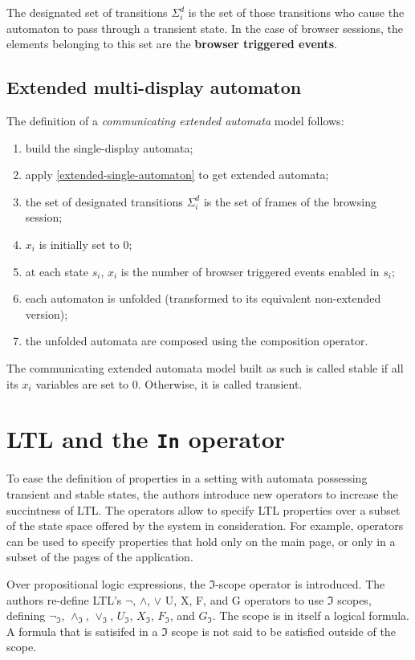 \documentclass[a4paper,10pt]{article}
\theoremstyle{plain} %
\theoremstyle{definition}
\theoremstyle{remark}
\begin{document}
The designated set of transitions $\Sigma^d_i$ is the set of those transitions who cause the automaton to pass through a transient state. In the case of browser sessions, the elements belonging to this set are the \textbf{browser triggered events}.

\subsection{Extended multi-display automaton}

The definition of a \textit{communicating extended automata} model follows:

\begin{enumerate}
  \item build the single-display automata;
  \item apply \cref{extended-single-automaton} to get extended automata;
  \item the set of designated transitions $\Sigma^d_i$ is the set of frames of the browsing session;
  \item $x_i$ is initially set to 0;
  \item at each state $s_i$, $x_i$ is the number of browser triggered events enabled in $s_i$;
  \item each automaton is unfolded (transformed to its equivalent non-extended version);
  \item the unfolded automata are composed using the composition operator.
\end{enumerate}

The communicating extended automata model built as such is called stable if all its $x_i$ variables are set to 0. Otherwise, it is called transient.

\section{LTL and the \textbf{\texttt{In}} operator}

To ease the definition of properties in a setting with automata possessing transient and stable states, the authors introduce new operators to increase the succintness of LTL. The operators allow to specify LTL properties over a subset of the state space offered by the system in consideration. For example, operators can be used to specify properties that hold only on the main page, or only in a subset of the pages of the application.

Over propositional logic expressions, the $\mathcal{\Im}$-scope operator is introduced. The authors re-define LTL's $\neg$, $\land$, $\lor$ U, X, F, and G operators to use $\mathcal{\Im}$ scopes, defining $\neg_{\mathcal{\Im}}$, $\land_{\mathcal{\Im}}$, $\lor_{\mathcal{\Im}}$, $U_{\mathcal{\Im}}$, $X_{\mathcal{\Im}}$, $F_{\mathcal{\Im}}$, and $G_{\mathcal{\Im}}$. The scope is in itself a logical formula. A formula that is satisifed in a $\Im$ scope is not said to be satisfied outside of the scope.
\end{document}

